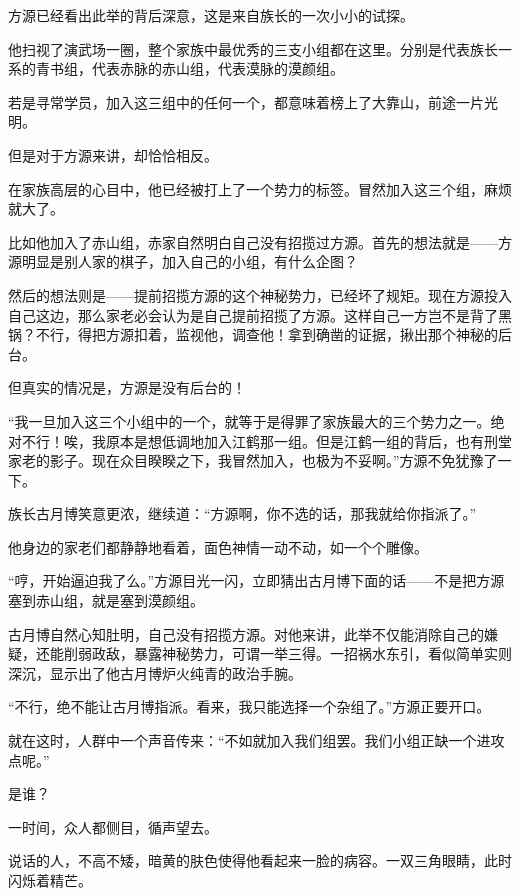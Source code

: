 
\begin{this_body}



方源已经看出此举的背后深意，这是来自族长的一次小小的试探。

他扫视了演武场一圈，整个家族中最优秀的三支小组都在这里。分别是代表族长一系的青书组，代表赤脉的赤山组，代表漠脉的漠颜组。

若是寻常学员，加入这三组中的任何一个，都意味着榜上了大靠山，前途一片光明。

但是对于方源来讲，却恰恰相反。

在家族高层的心目中，他已经被打上了一个势力的标签。冒然加入这三个组，麻烦就大了。

比如他加入了赤山组，赤家自然明白自己没有招揽过方源。首先的想法就是——方源明显是别人家的棋子，加入自己的小组，有什么企图？

然后的想法则是——提前招揽方源的这个神秘势力，已经坏了规矩。现在方源投入自己这边，那么家老必会认为是自己提前招揽了方源。这样自己一方岂不是背了黑锅？不行，得把方源扣着，监视他，调查他！拿到确凿的证据，揪出那个神秘的后台。

但真实的情况是，方源是没有后台的！

“我一旦加入这三个小组中的一个，就等于是得罪了家族最大的三个势力之一。绝对不行！唉，我原本是想低调地加入江鹤那一组。但是江鹤一组的背后，也有刑堂家老的影子。现在众目睽睽之下，我冒然加入，也极为不妥啊。”方源不免犹豫了一下。

族长古月博笑意更浓，继续道：“方源啊，你不选的话，那我就给你指派了。”

他身边的家老们都静静地看着，面色神情一动不动，如一个个雕像。

“哼，开始逼迫我了么。”方源目光一闪，立即猜出古月博下面的话——不是把方源塞到赤山组，就是塞到漠颜组。

古月博自然心知肚明，自己没有招揽方源。对他来讲，此举不仅能消除自己的嫌疑，还能削弱政敌，暴露神秘势力，可谓一举三得。一招祸水东引，看似简单实则深沉，显示出了他古月博炉火纯青的政治手腕。

“不行，绝不能让古月博指派。看来，我只能选择一个杂组了。”方源正要开口。

就在这时，人群中一个声音传来：“不如就加入我们组罢。我们小组正缺一个进攻点呢。”

是谁？

一时间，众人都侧目，循声望去。

说话的人，不高不矮，暗黄的肤色使得他看起来一脸的病容。一双三角眼睛，此时闪烁着精芒。


\end{this_body}
